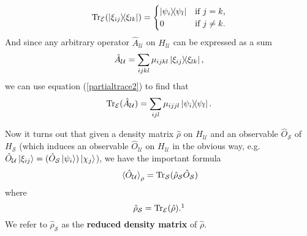     \begin{equation} \label{partialtrace2}
    \Tr_\mathcal{E}(\dyad{\xi_{ij}}{\xi_{lk}})=
    \begin{cases} \dyad{\psi_i}{\psi_l} & \text{if $j=k$,} \\
    0 & \text{if $j\neq k$}.
    \end{cases}
    \end{equation}
    And since any arbitrary  operator $\hat{A}_\mathcal{U}$ on $H_\mathcal{U}$ can be expressed as a sum $$\hat{A}_\mathcal{U}=\sum_{ijkl}\mu_{ijkl}\dyad{\xi_{ij}}{\xi_{lk}},$$ we can use equation (\ref{partialtrace2}) to find that $$\Tr_\mathcal{E}(\hat{A}_\mathcal{U})=\sum_{ijl}\mu_{ijjl}\dyad{\psi_i}{\psi_l}.$$
    
    Now it turns out that given a density matrix $\hat{\rho}$ on $H_\mathcal{U}$ and an observable $\hat{O}_\mathcal{S}$  of $H_\mathcal{S}$ (which induces an observable $\hat{O}_\mathcal{U}$ on $H_\mathcal{U}$ in the obvious way, e.g. $\hat{O}_\mathcal{U}\ket{\xi_{ij}}= (\hat{O}_\mathcal{S}\ket{\psi_i})\ket{\chi_j}$), we have the important formula 
    \begin{equation}\label{reducedev}
    \ev*{\hat{O}_\mathcal{U}}_\rho=\Tr_\mathcal{S}(\hat{\rho}_\mathcal{S}\hat{O}_\mathcal{S})
    \end{equation}    
    where 
    \begin{equation}\label{reduceddensity} \hat{\rho}_\mathcal{S}=\Tr_\mathcal{E}(\hat{\rho}).\protect\footnotemark
    \end{equation}We 
%
 refer to $\hat{\rho}_\mathcal{S}$ as the \textbf{reduced density matrix} of $\hat{\rho}$. 
    
